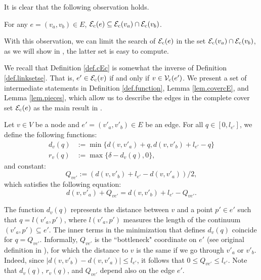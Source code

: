 It is clear that the following observation holds.
\begin{observation}\label{obser}
For any $e=(v_a,v_b)\in E$, ${\mathcal E}_{\mathrm{c}}(e)\subseteq {\mathcal E}_{\mathrm{c}}(v_a)\cap {\mathcal E}_{\mathrm{c}}(v_b)$.
\end{observation}
With this observation, we can limit the search of ${\mathcal E}_{\mathrm{c}}(e)$ in the set ${\mathcal E}_{\mathrm{c}}(v_a)\cap {\mathcal E}_{\mathrm{c}}(v_b)$, as we will show in , the latter set is easy to compute.



We recall that Definition \ref{def.cEc} is somewhat the inverse of Definition \ref{def.linksetse}. That is,  $e'\in {\mathcal E}_{\mathrm{c}}(v)$ if and only if $v \in \mathcal V_{\mathrm{c}}(e')$. We present a set of intermediate statements in Definition \ref{def.function}, Lemma \ref{lem.covercE}, and Lemma  \ref{lem.pieces}, which allow us to describe the edges in the complete cover set ${\mathcal E}_{\mathrm{c}}(e)$ as the main result in .

\begin{definition}\label{def.function}
Let $v\in V$ be a node and $e'=(v'_a,v'_b)\in E $ be an edge. For all $q \in [0, l_{e'}]$, we define the following functions:
\begin{align}
	d_v(q) &:= \min \{d(v,v'_a)+q, d(v,v'_b)+l_{e'}-q\} \nonumber\\
	r_v(q) &:= %
	\max\{\delta -  d_v(q),0\}, \nonumber
\end{align}
and constant:
$$Q_{ve'}:=(d(v,v'_b)+l_{e'} - d(v,v'_a))/2,$$  which satisfies the following equation:
$$d(v,v'_a)+Q_{ve'}=  d(v,v'_b)+l_{e'}-Q_{ve'}.$$
\end{definition}
The function $d_v(q)$ represents the distance between $v$ and a point $p'\in e'$ such that $q=l(v'_a,p')$, where $l(v'_a,p')$ measures the length of the continuum $(v'_a,p')\subseteq e'$.
The inner terms in the minimization that defines $ d_v(q)$ coincide for $q=Q_{ve'}$. Informally, $Q_{ve'}$ is the ``bottleneck" coordinate on $e'$ (see original definition in \cite{obnoxious}), for which the distance to $v$ is the same if we go through $v'_a$ or $v'_b$. Indeed, since $|d(v,v'_b) - d(v,v'_a)| \le l_{e'}$, it follows that $0 \le Q_{ve'} \le l_{e'}$.
Note that $d_v(q)$,  $r_v(q)$, and $Q_{ve'}$ depend also on the edge $e'$.


